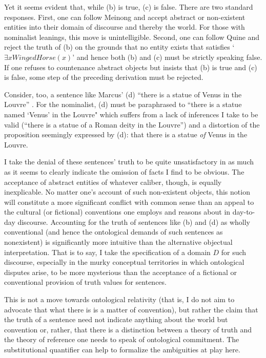 \documentclass[12pt,letterpaper]{article}
\begin{document}
\begin{doublespace}
Yet it seems evident that, while (b) is true, (c) is false.  There are
two standard responses.  First, one can follow Meinong and accept
abstract or non-existent entities into their domain of discourse and
thereby the world.  For those with nominalist leanings, this move is
unintelligible.  Second, one can follow Quine and reject the truth of
(b) on the grounds that no entity exists that satisfies `$\exists
xWingedHorse(x)$' and hence both (b) and (c) must be strictly speaking
false.  If one refuses to countenance abstract objects but insists
that (b) is true and (c) is false, some step of the preceding
derivation must be rejected.

Consider, too, a sentence like Marcus' (d) ``there is a statue of
Venus in the Louvre'' \cite{marcus72}.  For the nominalist, (d) must
be paraphrased to ``there is a statue named `Venus' in the Louvre"
which suffers from a lack of inferences I take to be valid (``there is
a statue of a Roman deity in the Louvre'') and a distortion of the
proposition seemingly expressed by (d): that there is a statue
\emph{of} Venus in the Louvre.

I take the denial of these sentences' truth to be quite unsatisfactory
in as much as it seems to clearly indicate the omission of facts I
find to be obvious.  The acceptance of abstract entities of whatever
caliber, though, is equally inexplicable.  No matter one's account of
such non-existent objects, this notion will constitute a more
significant conflict with common sense than an appeal to the cultural
(or fictional) conventions one employs and reasons about in day-to-day
discourse. Accounting for the truth of sentences like (b) and (d) as
wholly conventional (and hence the ontological demands of such
sentences as nonexistent) is significantly more intuitive than the
alternative objectual interpretation.  That is to say, I take the
specification of a domain $D$ for such discourse, especially in the
murky conceptual territories in which ontological disputes arise, to
be more mysterious than the acceptance of a fictional or conventional
provision of truth values for sentences.

This is not a move towards ontological relativity (that is, I do not
aim to advocate that what there is is a matter of convention), but
rather the claim that the truth of a sentence need not indicate
anything about the world but convention or, rather, that there is a
distinction between a theory of truth and the theory of reference one
needs to speak of ontological commitment.  The substitutional
quantifier can help to formalize the ambiguities at play here.



\end{doublespace}
\end{document}
